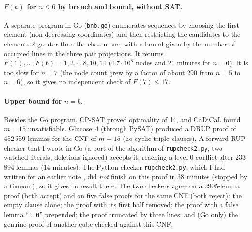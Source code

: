 \documentclass[11pt]{article}
\begin{document}
\paragraph{$F(n)$ for $n\le6$ by branch and bound, without SAT.} A separate program in Go (\texttt{bnb.go}) enumerates sequences by choosing the first element (non-decreasing coordinates) and then restricting the candidates to the elements $2$-greater than the chosen one, with a bound given by the number of occupied lines in the three pair projections. It returns $F(1),\dots,F(6)=1,2,4,8,10,14$ ($4.7\cdot10^{8}$ nodes and 21 minutes for $n=6$). It is too slow for $n=7$ (the node count grew by a factor of about 290 from $n=5$ to $n=6$), so it gives no independent check of $F(7)\le17$.

\paragraph{Upper bound for $n=6$.} Besides the Go program, CP-SAT proved optimality of 14, and CaDiCaL found $m=15$ unsatisfiable. Glucose~4 (through PySAT) produced a DRUP proof of 452\,559 lemmas for the CNF of $m=15$ (no cyclic-triple clauses). A forward RUP checker that I wrote in Go (a port of the algorithm of \texttt{rupcheck2.py}, two watched literals, deletions ignored) accepts it, reaching a level-0 conflict after 233\,894 lemmas (14 minutes). The Python checker \texttt{rupcheck2.py}, which I had written for an earlier note \cite{green22note}, did \emph{not} finish on this proof in 38 minutes (stopped by a timeout), so it gives no result there. The two checkers agree on a 2905-lemma proof (both accept) and on five false proofs for the same CNF (both reject): the empty clause alone; the proof with its first half removed; the proof with a false lemma ``\texttt{1 0}'' prepended; the proof truncated by three lines; and (Go only) the genuine proof of another cube checked against this CNF.
\end{document}

